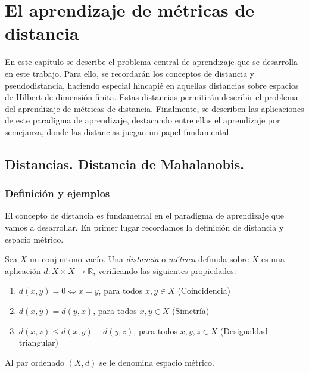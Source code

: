 \chapter{El aprendizaje de métricas de distancia} \label{chapter:dml_theory}

En este capítulo se describe el problema central de aprendizaje que se desarrolla en este trabajo. Para ello, se recordarán los conceptos de distancia y pseudodistancia, haciendo especial hincapié en aquellas distancias sobre espacios de Hilbert de dimensión finita. Estas distancias permitirán describir el problema del aprendizaje de métricas de distancia. Finalmente, se describen las aplicaciones de este paradigma de aprendizaje, destacando entre ellas el aprendizaje por semejanza, donde las distancias juegan un papel fundamental.

\section{Distancias. Distancia de Mahalanobis.}

\subsection{Definición y ejemplos}

El concepto de distancia es fundamental en el paradigma de aprendizaje que vamos a desarrollar. En primer lugar recordamos la definición de distancia y espacio métrico.

\begin{definition}[Distancia]
    Sea $X$ un  conjuntono vacío. Una \emph{distancia} o \emph{métrica} definida sobre $X$ es una aplicación $d:X\times X \to \mathbb{R}$, verificando las siguientes propiedades:
    
    \begin{enumerate}
        \item $d(x,y)=0  \iff x = y $, para todos $x,y \in X$ (Coincidencia) \label{item:dist:coincid}
        \item $d(x,y)=d(y,x)$, para todos  $x,y \in X$ (Simetría)  \label{item:dist:sim}
        \item $d(x,z)\le d(x,y)+d(y,z)$, para todos $x,y,z \in X$ (Desigualdad triangular) \label{item:dist:triang}
    \end{enumerate}
    
    Al par ordenado $(X,d)$ se le denomina espacio métrico.
\end{definition}

